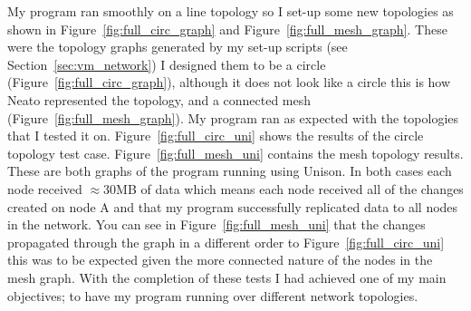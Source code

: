 \documentclass[12pt]{article}
\begin{document}
My program ran smoothly on a line topology so I
set-up some new topologies as shown in 
Figure~\ref{fig:full_circ_graph} and Figure~\ref{fig:full_mesh_graph}.
These were the topology graphs generated by my set-up scripts (see
Section~\ref{sec:vm_network}) I designed them to be a circle
(Figure~\ref{fig:full_circ_graph}), although it does not look like
a circle this is how Neato represented the topology,
and a connected mesh
(Figure~\ref{fig:full_mesh_graph}). 
My program ran as expected with the topologies that
I tested it on. Figure~\ref{fig:full_circ_uni}
shows the results of the circle topology test case.
Figure~\ref{fig:full_mesh_uni} contains the mesh
topology results. These are both graphs of
the program running using Unison. In both cases each node
received $\approx$30MB of data which means each
node received all of the changes created on node A
and that my program successfully replicated data to all
nodes in the network. You can see in Figure~\ref{fig:full_mesh_uni}
that the changes propagated through the graph in a different
order to Figure~\ref{fig:full_circ_uni} this was to be
expected given the more connected nature of the nodes
in the mesh graph.
With the completion of these tests I had achieved
one of my main objectives; to have my program running over
different network topologies.

\end{document}
